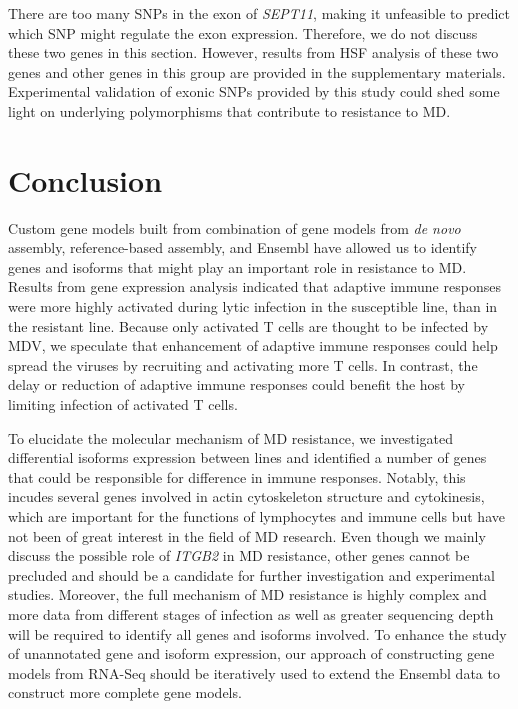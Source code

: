 There are too many SNPs in the exon of {\em SEPT11}, making it
unfeasible to predict which SNP might regulate the exon
expression.  Therefore, we do not discuss these two genes in this
section.  However, results from HSF analysis of these two genes
and other genes in this group are provided in the supplementary
materials.  Experimental validation of exonic SNPs provided by
this study could shed some light on underlying polymorphisms that
contribute to resistance to MD.

\section{Conclusion}

Custom gene models built from combination of gene models from {\em de
novo} assembly, reference-based assembly, and Ensembl have allowed us
to identify genes and isoforms that might play an important role in
resistance to MD.  Results from gene expression analysis indicated
that adaptive immune responses were more highly activated during lytic
infection in the susceptible line, than in the resistant line.
Because only activated T cells are thought to be infected by MDV, we
speculate that enhancement of adaptive immune responses could help
spread the viruses by recruiting and activating more T cells.  In
contrast, the delay or reduction of adaptive immune responses could
benefit the host by limiting infection of activated T cells.

To elucidate the molecular mechanism of MD resistance, we
investigated differential isoforms expression between lines  and
identified a number of genes that could be responsible for
difference in immune responses. Notably, this incudes several genes
involved in actin cytoskeleton structure and cytokinesis, which are
important for the functions of lymphocytes and immune cells but
have not been of great interest in the field of MD research.
Even though we mainly discuss the possible role of {\em ITGB2}
in MD resistance, other genes cannot be precluded and should be a
candidate for further investigation and experimental studies.
Moreover, the full mechanism of MD resistance is highly complex and
more data from different stages of infection as well as greater
sequencing depth will be required to identify all genes and
isoforms involved.  To enhance the study of unannotated gene and
isoform expression, our approach of constructing gene models from
RNA-Seq should be iteratively used to extend the Ensembl data
to construct more complete gene models.

